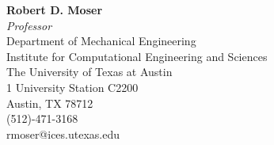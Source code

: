 \textbf{Robert D. Moser}\\
\textit{Professor}\\
Department of Mechanical Engineering\\
Institute for Computational Engineering and Sciences\\
The University of Texas at Austin\\
1 University Station C2200\\
Austin, TX 78712\\
(512)-471-3168\\
rmoser@ices.utexas.edu
%
%
\blankline
%

